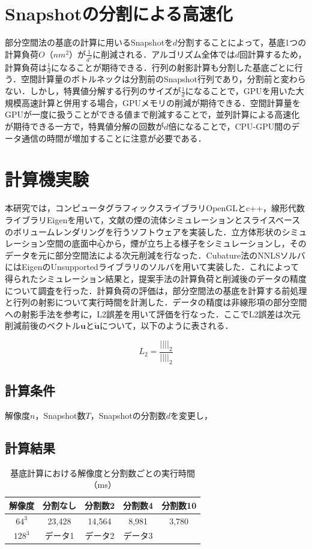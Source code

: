 \documentclass[a4j,12pt]{jreport}
\begin{document}
\section{Snapshotの分割による高速化}
部分空間法の基底の計算に用いるSnapshotを$d$分割することによって，基底1つの計算負荷$O（nm^2）$が$\frac{1}{d^2}$に削減される．アルゴリズム全体では$d$回計算するため，計算負荷は$\frac{1}{d}$になることが期待できる．行列の射影計算も分割した基底ごとに行う．空間計算量のボトルネックは分割前のSnapshot行列であり，分割前と変わらない．しかし，特異値分解する行列のサイズが$\frac{1}{d}$になることで，GPUを用いた大規模高速計算と併用する場合，GPUメモリの削減が期待できる．空間計算量をGPUが一度に扱うことができる値まで削減することで，並列計算による高速化が期待できる一方で，特異値分解の回数が$d$倍になることで，CPU-GPU間のデータ通信の時間が増加することに注意が必要である．

\section{計算機実験}
本研究では，コンピュータグラフィックスライブラリOpenGLとc++，線形代数ライブラリEigenを用いて，文献\cite{fedkiw}の煙の流体シミュレーションとスライスベースのボリュームレンダリングを行うソフトウェアを実装した．立方体形状のシミュレーション空間の底面中心から，煙が立ち上る様子をシミュレーションし，そのデータを元に部分空間法による次元削減を行なった．Cubature法のNNLSソルバにはEigenのUnsupportedライブラリのソルバを用いて実装した．これによって得られたシミュレーション結果と，提案手法の計算負荷と削減後のデータの精度について調査を行った．計算負荷の評価は，部分空間法の基底を計算する前処理と行列の射影について実行時間を計測した．データの精度は非線形項の部分空間への射影手法\cite{projection_base}を参考に，L2誤差を用いて評価を行なった．ここでL2誤差は次元削減前後のベクトル$\bm{u}$と$\bm{\tilde{u}}$について，以下のように表される．

\[
L_2 = \frac{||  ||_2}{||  ||_2}
\]


\subsection{計算条件}
解像度$n$，Snapshot数$T$，Snapshotの分割数$d$を変更し，

\subsection{計算結果}
\begin {table}[t]
    \centering
  \caption{基底計算における解像度と分割数ごとの実行時間（ms）}
  \label{tab:results}
  \begin {tabular}{ccccc} \hline
    解像度 					&分割なし 		&分割数2			&分割数4 		&分割数10\\ \hline
    $64^3$ 					& 23,428 			&14,564	 		&8,981	 	&3,780\\
    $128^3$ 				& データ1 		& データ2 		& データ3 	&\\ \hline
  \end {tabular}
\end {table}
\end{document}
